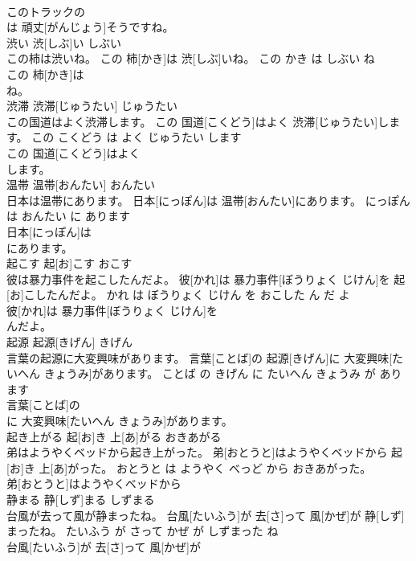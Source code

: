 \documentclass[8pt]{extreport}
\begin{document}
\begin{CJK}{UTF8}{min}
\\	このトラックの
\\	は 頑丈[がんじょう]そうですね。			
\\	渋い	渋[しぶ]い	しぶい	
\\	この柿は渋いね。	この 柿[かき]は 渋[しぶ]いね。	この かき は しぶい ね	
\\	この 柿[かき]は
\\	ね。			
\\	渋滞	渋滞[じゅうたい]	じゅうたい	
\\	この国道はよく渋滞します。	この 国道[こくどう]はよく 渋滞[じゅうたい]します。	この こくどう は よく じゅうたい します	
\\	この 国道[こくどう]はよく
\\	します。			
\\	温帯	温帯[おんたい]	おんたい	
\\	日本は温帯にあります。	日本[にっぽん]は 温帯[おんたい]にあります。	にっぽん は おんたい に あります	
\\	日本[にっぽん]は
\\	にあります。			
\\	起こす	起[お]こす	おこす	
\\	彼は暴力事件を起こしたんだよ。	彼[かれ]は 暴力事件[ぼうりょく じけん]を 起[お]こしたんだよ。	かれ は ぼうりょく じけん を おこした ん だ よ	
\\	彼[かれ]は 暴力事件[ぼうりょく じけん]を
\\	んだよ。			
\\	起源	起源[きげん]	きげん	
\\	言葉の起源に大変興味があります。	言葉[ことば]の 起源[きげん]に 大変興味[たいへん きょうみ]があります。	ことば の きげん に たいへん きょうみ が あります	
\\	言葉[ことば]の
\\	に 大変興味[たいへん きょうみ]があります。			
\\	起き上がる	起[お]き 上[あ]がる	おきあがる	
\\	弟はようやくベッドから起き上がった。	弟[おとうと]はようやくベッドから 起[お]き 上[あ]がった。	おとうと は ようやく べっど から おきあがった。	
\\	弟[おとうと]はようやくベッドから
\\	静まる	静[しず]まる	しずまる	
\\	台風が去って風が静まったね。	台風[たいふう]が 去[さ]って 風[かぜ]が 静[しず]まったね。	たいふう が さって かぜ が しずまった ね	
\\	台風[たいふう]が 去[さ]って 風[かぜ]が

\end{CJK}
\end{document}
